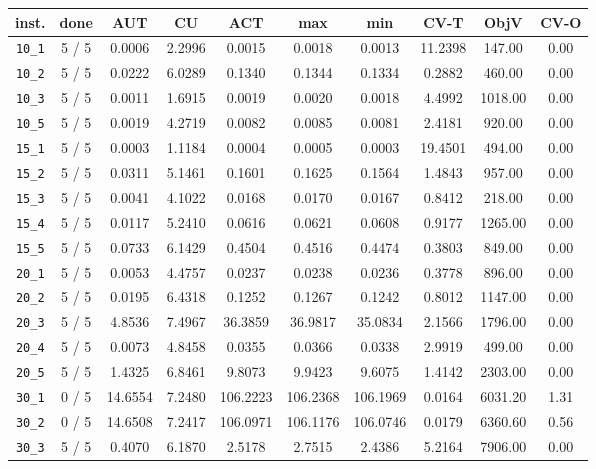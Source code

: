 \documentclass{scrartcl}
\begin{document}
\begin{table}[h!]
\begin{center}
\small
\begin{tabular}{| c | c | c | c | c | c | c | c | c | c |}
\hline
inst. & done & AUT & CU & ACT & max & min & CV-T & ObjV & CV-O \\
\hline
\verb|10_1| & 5 / 5 & 0.0006 & 2.2996 & 0.0015 & 0.0018 & 0.0013 & 11.2398 & 147.00 & 0.00\\ 
\verb|10_2| & 5 / 5 & 0.0222 & 6.0289 & 0.1340 & 0.1344 & 0.1334 & 0.2882 & 460.00 & 0.00\\ 
\verb|10_3| & 5 / 5 & 0.0011 & 1.6915 & 0.0019 & 0.0020 & 0.0018 & 4.4992 & 1018.00 & 0.00\\ 
\verb|10_5| & 5 / 5 & 0.0019 & 4.2719 & 0.0082 & 0.0085 & 0.0081 & 2.4181 & 920.00 & 0.00\\ 
\verb|15_1| & 5 / 5 & 0.0003 & 1.1184 & 0.0004 & 0.0005 & 0.0003 & 19.4501 & 494.00 & 0.00\\ 
\verb|15_2| & 5 / 5 & 0.0311 & 5.1461 & 0.1601 & 0.1625 & 0.1564 & 1.4843 & 957.00 & 0.00\\ 
\verb|15_3| & 5 / 5 & 0.0041 & 4.1022 & 0.0168 & 0.0170 & 0.0167 & 0.8412 & 218.00 & 0.00\\ 
\verb|15_4| & 5 / 5 & 0.0117 & 5.2410 & 0.0616 & 0.0621 & 0.0608 & 0.9177 & 1265.00 & 0.00\\ 
\verb|15_5| & 5 / 5 & 0.0733 & 6.1429 & 0.4504 & 0.4516 & 0.4474 & 0.3803 & 849.00 & 0.00\\ 
\verb|20_1| & 5 / 5 & 0.0053 & 4.4757 & 0.0237 & 0.0238 & 0.0236 & 0.3778 & 896.00 & 0.00\\ 
\verb|20_2| & 5 / 5 & 0.0195 & 6.4318 & 0.1252 & 0.1267 & 0.1242 & 0.8012 & 1147.00 & 0.00\\ 
\verb|20_3| & 5 / 5 & 4.8536 & 7.4967 & 36.3859 & 36.9817 & 35.0834 & 2.1566 & 1796.00 & 0.00\\ 
\verb|20_4| & 5 / 5 & 0.0073 & 4.8458 & 0.0355 & 0.0366 & 0.0338 & 2.9919 & 499.00 & 0.00\\ 
\verb|20_5| & 5 / 5 & 1.4325 & 6.8461 & 9.8073 & 9.9423 & 9.6075 & 1.4142 & 2303.00 & 0.00\\ 
\verb|30_1| & 0 / 5 & 14.6554 & 7.2480 & 106.2223 & 106.2368 & 106.1969 & 0.0164 & 6031.20 & 1.31\\ 
\verb|30_2| & 0 / 5 & 14.6508 & 7.2417 & 106.0971 & 106.1176 & 106.0746 & 0.0179 & 6360.60 & 0.56\\ 
\verb|30_3| & 5 / 5 & 0.4070 & 6.1870 & 2.5178 & 2.7515 & 2.4386 & 5.2164 & 7906.00 & 0.00\\ 

\end{tabular}
\end{center}
\end{table}
\end{document}
